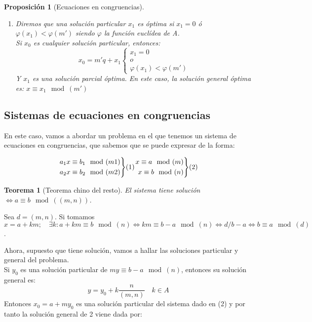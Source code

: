 \documentclass[11pt, a4paper, titlepage]{article}
\makeatletter
\newif\IfInSansMode
\let\oldsf\sffamily
\renewcommand*{\sffamily}{\oldsf\mathversion{sans}\InSansModetrue}
\let\oldnorm\normalfont
\renewcommand*{\normalfont}{\oldnorm\InSansModefalse\mathversion{normal}}
\renewenvironment{proof}[1][\proofname] {\vspace{-15pt}\par\pushQED{\qed}\normalfont\topsep6\p@\@plus6\p@\relax\trivlist\item[\hskip\labelsep\it#1\@addpunct{.}]\ignorespaces}{\popQED\endtrivlist\@endpefalse}
\renewenvironment{proof}[1][\proofname] {\par\pushQED{\qed}\normalfont\topsep6\p@\@plus6\p@\relax\trivlist\item[\hskip\labelsep\itshape\sffamily#1\@addpunct{.}]\ignorespaces}{\popQED\endtrivlist\@endpefalse}
\theoremstyle{theorem-style}
\newtheorem{nth}{Teorema}[section]
\newtheorem{nprop}{Proposición}[section]
\theoremstyle{definition-style}
\theoremstyle{remark-style}
\theoremstyle{example-style}
\newenvironment{rcases}
  {\left.\begin{aligned}}
  {\end{aligned}\right\rbrace}
\makeatother
\begin{document}
\begin{nprop}[Ecuaciones en congruencias]
\begin{itemize}
\begin{enumerate}
\item Diremos que una solución particular $x_1$ es óptima si $x_1 = 0$ ó $\varphi(x_1) < \varphi(m')$ siendo $\varphi$ la función euclídea de A.\\
Si $x_0$ es cualquier solución particular, entonces:
\[
x_0 = m'q + x_1 \begin{cases}
	x_1 = 0\\
	o\\
	\varphi(x_1) < \varphi(m')

\end{cases}
\]
Y $x_1$ es una solución parcial óptima. En este caso, la solución general óptima es: $x\equiv x_1 \mod(m')$
\end{enumerate}
\end{itemize}

\end{nprop}

\subsection{Sistemas de ecuaciones en congruencias}

En este caso, vamos a abordar un problema en el que tenemos un sistema de ecuaciones en congruencias, que sabemos que se puede expresar de la forma:

\[
\begin{rcases}
	a_1x \equiv b_1 \mod(m1)\\
	a_2x \equiv b_2 \mod(m2)
\end{rcases}(1) \begin{rcases}
	x \equiv a \mod(m)\\
	x \equiv b \mod(n)
\end{rcases}(2)
\]

\begin{nth}[Teorema chino del resto]
	El sistema tiene solución $\iff a \equiv b \mod((m,n))$.
\end{nth}
\begin{proof}
	Sea $d=(m,n)$. Si tomamos $x = a+km; \quad \exists k: a+km \equiv b \mod(n) \iff km \equiv b-a \mod(n) \iff d/b-a \iff b\equiv a\mod(d)$.
\end{proof}

Ahora, supuesto que tiene solución, vamos a hallar las soluciones particular y general del problema.\\
Si $y_0$ es una solución particular de $my \equiv b-a \mod(n)$, entonces su solución general es: $$y = y_0 + k\frac{n}{(m,n)} \quad k \in A$$
Entonces $x_0 = a + my_0$ es una solución particular del sistema dado en (2) y por tanto la solución general de 2 viene dada por:
\end{document}
